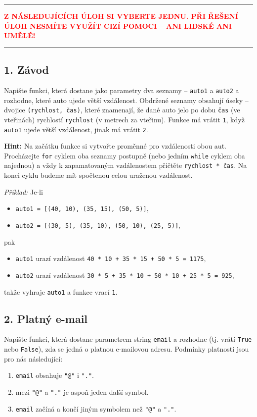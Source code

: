 \documentclass[a4paper,11pt]{article}
\newcommand{\clr}{\textcolor{red}}
\begin{document}
\thispagestyle{empty}

\hrule
\vspace*{-1em}
\begin{center}
 \clr{\textbf{Z NÁSLEDUJÍCÍCH ÚLOH SI VYBERTE JEDNU. PŘI ŘEŠENÍ ÚLOH 
  NESMÍTE VYUŽÍT CIZÍ POMOCI -- ANI LIDSKÉ ANI UMĚLÉ!}}
\end{center}
\hrule

\subsection*{1. Závod}

Napište funkci, která dostane jako parametry dva seznamy -- \texttt{auto1} a
\texttt{auto2} a rozhodne, které auto ujede větší vzdálenost. Obdržené seznamy
obsahují úseky -- dvojice \texttt{(rychlost, čas)}, které znamenají, že dané
auto jelo po dobu \texttt{čas} (ve vteřinách) rychlostí \texttt{rychlost} (v
metrech za vteřinu). Funkce má vrátit \texttt{1}, když \texttt{auto1} ujede
větší vzdálenost, jinak má vrátit \texttt{2}.

\textbf{Hint:} Na začátku funkce si vytvořte proměnné pro vzdálenosti obou aut.
Procházejte \texttt{for} cyklem oba seznamy postupně (nebo jedním \texttt{while}
cyklem oba najednou) a vždy k zapamatovaným vzdálenostem přičtěte
\texttt{rychlost * čas}. Na konci cyklu budeme mít spočtenou celou uraženou
vzdálenost.

\emph{Příklad:} Je-li
\begin{itemize}
 \item \texttt{auto1 = [(40, 10), (35, 15), (50, 5)]},
 \item \texttt{auto2 = [(30, 5), (35, 10), (50, 10), (25, 5)]},
\end{itemize}
pak
\begin{itemize}
 \item \texttt{auto1} urazí vzdálenost \texttt{40 * 10 + 35 * 15 + 50 * 5 =
  1175},
 \item \texttt{auto2} urazí vzdálenost \texttt{30 * 5 + 35 * 10 + 50 * 10 + 25 *
  5 = 925},
\end{itemize}
takže vyhraje \texttt{auto1} a funkce vrací \texttt{1}.

\clearpage

\subsection*{2. Platný e-mail}

Napište funkci, která dostane parametrem string \texttt{email} a rozhodne (tj.
vrátí \texttt{True} nebo \texttt{False}), zda se jedná o platnou e-mailovou
adresu. Podmínky platnosti jsou pro nás následující:
\begin{enumerate}
 \item \texttt{email} obsahuje \texttt{"@"} i \texttt{"."}.
 \item mezi \texttt{"@"} a \texttt{"."} je aspoň jeden další symbol.
 \item \texttt{email} začíná a končí jiným symbolem než \texttt{"@"} a
  \texttt{"."}.
\end{enumerate}
\end{document}
